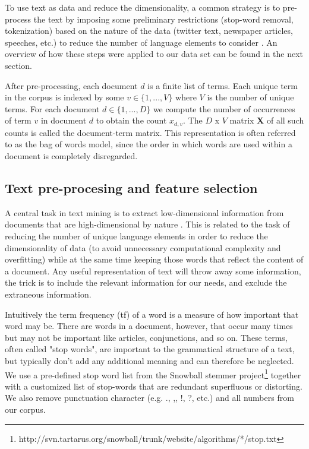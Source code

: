 \documentclass[12pt,a4paper,notitlepage]{article}
\begin{document}
To use text as data and reduce the dimensionality, a common strategy is to pre-process the text by imposing some preliminary restrictions (stop-word removal, tokenization) based on the nature of the data (twitter text, newspaper articles, speeches, etc.) to reduce the number of language elements to consider \citep{gentzkow_text_2017}. An overview of how these steps were applied to our data set can be found in the next section. 

After pre-processing, each document $d$ is a finite list of terms. Each unique term in the corpus is indexed by some $v \in \lbrace 1,...,V \rbrace$ where $V$ is the number of unique terms. For each document $d \in \lbrace 1,...,D \rbrace$ we compute the number of occurrences of term $v$ in document $d$ to obtain the count $x_{d,v}$. The $D$ x $V$ matrix $\boldsymbol{X}$ of all such counts is called the document-term matrix. This representation is often referred to as the bag of words model, since the order in which words are used within a document is completely disregarded. 


\subsection{Text pre-procesing and feature selection}

A central task in text mining is to extract low-dimensional information from documents that are high-dimensional by nature \citep{bholat_text_2015}. This is related to the task of reducing the number of unique language elements in order to reduce the dimensionality of data (to avoid unnecessary computational complexity and overfitting) while at the same time keeping those words that reflect the content of a document. Any useful representation of text will throw away some information, the trick is to include the relevant information for our needs, and exclude the extraneous information. 

Intuitively the term frequency (tf) of a word is a measure of how important that word may be. There are words in a document, however, that occur many times but may not be important like articles, conjunctions, and so on. These terms, often called "stop words", are important to the grammatical structure of a text, but typically don't add any additional meaning and can therefore be neglected. We use a pre-defined stop word list from the Snowball stemmer project\footnote{http://svn.tartarus.org/snowball/trunk/website/algorithms/*/stop.txt} together with a customized list of stop-words that are redundant superfluous or distorting. We also remove punctuation character (e.g. ., ,, !, ?, etc.) and all numbers from our corpus.  
\end{document}

